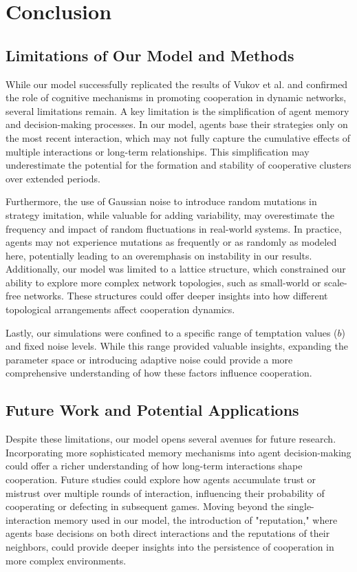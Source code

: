 \documentclass[runningheads]{llncs}
\begin{document}
\section{Conclusion}

\subsection{Limitations of Our Model and Methods}
While our model successfully replicated the results of Vukov et al. and confirmed the role of cognitive mechanisms in promoting cooperation in dynamic networks, several limitations remain. A key limitation is the simplification of agent memory and decision-making processes. In our model, agents base their strategies only on the most recent interaction, which may not fully capture the cumulative effects of multiple interactions or long-term relationships. This simplification may underestimate the potential for the formation and stability of cooperative clusters over extended periods.

Furthermore, the use of Gaussian noise to introduce random mutations in strategy imitation, while valuable for adding variability, may overestimate the frequency and impact of random fluctuations in real-world systems. In practice, agents may not experience mutations as frequently or as randomly as modeled here, potentially leading to an overemphasis on instability in our results. Additionally, our model was limited to a lattice structure, which constrained our ability to explore more complex network topologies, such as small-world or scale-free networks. These structures could offer deeper insights into how different topological arrangements affect cooperation dynamics.

Lastly, our simulations were confined to a specific range of temptation values (\( b \)) and fixed noise levels. While this range provided valuable insights, expanding the parameter space or introducing adaptive noise could provide a more comprehensive understanding of how these factors influence cooperation.

\subsection{Future Work and Potential Applications}
Despite these limitations, our model opens several avenues for future research. Incorporating more sophisticated memory mechanisms into agent decision-making could offer a richer understanding of how long-term interactions shape cooperation. Future studies could explore how agents accumulate trust or mistrust over multiple rounds of interaction, influencing their probability of cooperating or defecting in subsequent games. Moving beyond the single-interaction memory used in our model, the introduction of "reputation," where agents base decisions on both direct interactions and the reputations of their neighbors, could provide deeper insights into the persistence of cooperation in more complex environments.
\end{document}
